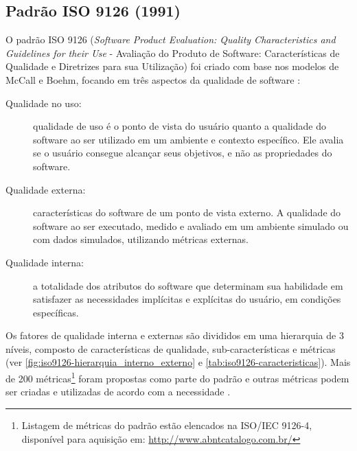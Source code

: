 \documentclass[
	12pt,				%
	openright,			%
	oneside,			%
	a4paper,			%
	english,			%
	brazil,				%
	]{abntex2}
\begin{document}
\subsection{Padrão ISO 9126 (1991)}
O padrão ISO 9126 (\emph{Software Product Evaluation: Quality Characteristics and Guidelines for their Use} - Avaliação do Produto de Software: Características de Qualidade e Diretrizes para sua Utilização) foi criado com base nos modelos de McCall e Boehm, focando em três aspectos da qualidade de software \cite{SURYN2014}:
\begin{description}
    \item [Qualidade no uso:] qualidade de uso é o ponto de vista do usuário quanto a qualidade do software ao ser utilizado em um ambiente e contexto específico. Ele avalia se o usuário consegue alcançar seus objetivos, e não as propriedades do software.
    \item [Qualidade externa:] características do software de um ponto de vista externo. A qualidade do software ao ser executado, medido e avaliado em um ambiente simulado ou com dados simulados, utilizando métricas externas.
    \item [Qualidade interna:] a totalidade dos atributos do software que determinam sua habilidade em satisfazer as necessidades implícitas e explícitas do usuário, em condições específicas.
\end{description}

Os fatores de qualidade interna e externas são divididos em uma hierarquia de 3 níveis, composto de características de qualidade, sub-características e métricas (ver \autoref{fig:iso9126-hierarquia_interno_externo} e \autoref{tab:iso9126-caracteristicas}). Mais de 200 métricas\footnote{Listagem de métricas do padrão estão elencados na ISO/IEC 9126-4, disponível para aquisição em: \url{http://www.abntcatalogo.com.br/}} foram propostas como parte do padrão e outras métricas podem ser criadas e utilizadas de acordo com a necessidade \cite{SURYN2014}.
\end{document}
